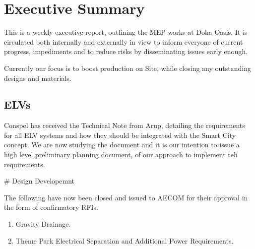 \chapter*{Executive Summary}

This is a weekly executive report, outlining the MEP works at Doha Oasis.
It is circulated both internally and externally in view to inform everyone
of current progress, impediments and to reduce risks by disseminating issues 
early enough.

Currently our focus is to boost production on Site, while closing any outstanding designs
and materials.

\section*{ELVs}

Conspel has received the Technical Note from Arup, detailing the requirements for 
all ELV systems and how they should be integrated with the Smart City concept. We are now
studying the document and it is our intention to issue a high level preliminary planning
document, of our approach to implement teh requirements.

# Design Developemnt

The following have now been closed and issued to AECOM for their approval in the form of
confirmatory RFIs.

\begin{enumerate}
\item Gravity Drainage.
\item Theme Park Electrical Separation and Additional Power Requirements.
\end{enumerate}


